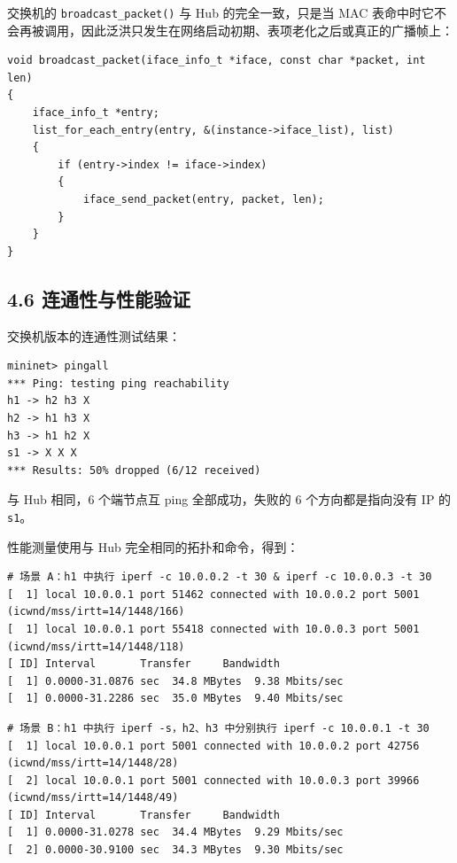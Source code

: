 \documentclass[UTF8,12pt,a4paper,fontset=fandol]{ctexart}
\begin{document}
交换机的 \texttt{broadcast_packet()} 与 Hub 的完全一致，只是当 MAC 表命中时它不会再被调用，因此泛洪只发生在网络启动初期、表项老化之后或真正的广播帧上：

\begin{verbatim}
void broadcast_packet(iface_info_t *iface, const char *packet, int len)
{
    iface_info_t *entry;
    list_for_each_entry(entry, &(instance->iface_list), list)
    {
        if (entry->index != iface->index)
        {
            iface_send_packet(entry, packet, len);
        }
    }
}
\end{verbatim}

\subsection*{4.6 连通性与性能验证}

交换机版本的连通性测试结果：

\begin{verbatim}
mininet> pingall
*** Ping: testing ping reachability
h1 -> h2 h3 X 
h2 -> h1 h3 X 
h3 -> h1 h2 X 
s1 -> X X X 
*** Results: 50% dropped (6/12 received)
\end{verbatim}

与 Hub 相同，6 个端节点互 ping 全部成功，失败的 6 个方向都是指向没有 IP 的 \texttt{s1}。

性能测量使用与 Hub 完全相同的拓扑和命令，得到：

\begin{verbatim}
# 场景 A：h1 中执行 iperf -c 10.0.0.2 -t 30 & iperf -c 10.0.0.3 -t 30
[  1] local 10.0.0.1 port 51462 connected with 10.0.0.2 port 5001 (icwnd/mss/irtt=14/1448/166)
[  1] local 10.0.0.1 port 55418 connected with 10.0.0.3 port 5001 (icwnd/mss/irtt=14/1448/118)
[ ID] Interval       Transfer     Bandwidth
[  1] 0.0000-31.0876 sec  34.8 MBytes  9.38 Mbits/sec
[  1] 0.0000-31.2286 sec  35.0 MBytes  9.40 Mbits/sec
\end{verbatim}

\begin{verbatim}
# 场景 B：h1 中执行 iperf -s，h2、h3 中分别执行 iperf -c 10.0.0.1 -t 30
[  1] local 10.0.0.1 port 5001 connected with 10.0.0.2 port 42756 (icwnd/mss/irtt=14/1448/28)
[  2] local 10.0.0.1 port 5001 connected with 10.0.0.3 port 39966 (icwnd/mss/irtt=14/1448/49)
[ ID] Interval       Transfer     Bandwidth
[  1] 0.0000-31.0278 sec  34.4 MBytes  9.29 Mbits/sec
[  2] 0.0000-30.9100 sec  34.3 MBytes  9.30 Mbits/sec
\end{verbatim}
\end{document}

